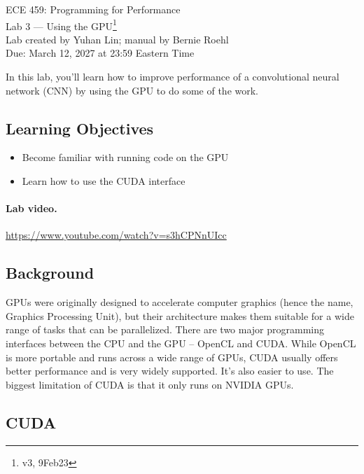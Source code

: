 



\begin{center}
{\Large ECE 459: Programming for Performance}\\
{\Large Lab 3 --- Using the GPU\footnote{v3, 9Feb23}}\\[1em]
Lab created by Yuhan Lin; manual by Bernie Roehl\\
Due: March 12, 2027 at 23:59 Eastern Time
\end{center}

In this lab, you'll learn how to improve performance of a convolutional neural network (CNN) by using the GPU to do some of the work.


\subsection*{Learning Objectives}

\begin{itemize}[noitemsep]
	\item Become familiar with running code on the GPU

	\item Learn how to use the CUDA interface
\end{itemize}

\paragraph{Lab video.} \url{https://www.youtube.com/watch?v=s3hCPNnUIcc}

\subsection*{Background}

GPUs were originally designed to accelerate computer graphics (hence the name, Graphics Processing Unit), but their architecture makes them suitable for a wide range of tasks that can be parallelized. There are two major programming interfaces between the CPU and the GPU -- OpenCL and CUDA. While OpenCL is more portable and runs across a wide range of GPUs, CUDA usually offers better performance and is very widely supported. It's also easier to use. The biggest limitation of CUDA is that it only runs on NVIDIA GPUs.

\subsection*{CUDA}

